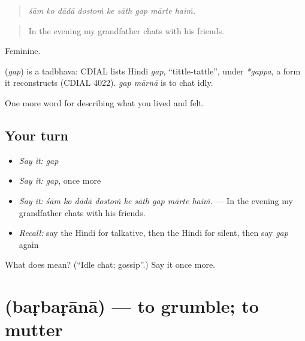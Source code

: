 \begin{quote}
        
\end{quote}

\begin{quote}
\emph{śām ko dādā dostoṁ ke sāth gap mārte haiṁ.}
\end{quote}

\begin{quote}
In the evening my grandfather chats with his friends.
\end{quote}

Feminine.

\begin{cousinweb}
\textbf{} (\emph{gap}) is a tadbhava: CDIAL lists Hindi \emph{gap}, \textquotedblleft{}tittle-tattle\textquotedblright{}, under \emph{*gappa}, a form it reconstructs (CDIAL 4022). \emph{gap mārnā} is to chat idly.
\end{cousinweb}

\begin{grammarlens}[title={What you've built}]
One more word for describing what you lived and felt.
\end{grammarlens}

\subsection*{Your turn}
\begin{itemize}
\raggedright
  \item \emph{Say it:} \emph{gap}
  \item \emph{Say it:} \emph{gap}, once more
  \item \emph{Say it:} \emph{śām ko dādā dostoṁ ke sāth gap mārte haiṁ.} — In the evening my grandfather chats with his friends.
  \item \emph{Recall:} say the Hindi for talkative, then the Hindi for silent, then say \emph{gap} again
\end{itemize}

\begin{tcolorbox}[breakable,colback=teal!4,colframe=teal!35!black,title={Before you move on}]
What does  mean? (\textquotedblleft{}Idle chat; gossip\textquotedblright{}.) Say it once more.
\end{tcolorbox}
\section[\texorpdfstring{\hi{बड़बड़ाना} (baṛbaṛānā)}{बड़बड़ाना (baṛbaṛānā)}]{ (baṛbaṛānā) — to grumble; to mutter}


